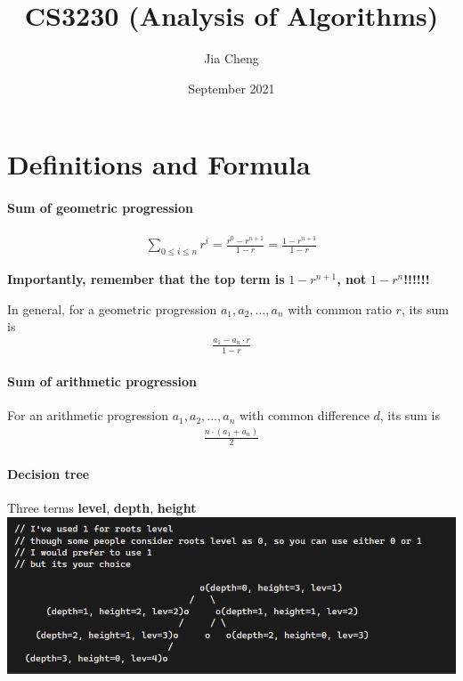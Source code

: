 \documentclass{article}
\title{CS3230 (Analysis of Algorithms)}
\author{Jia Cheng}
\date{September 2021}
\begin{document}
\maketitle

\section{Definitions and Formula}
\paragraph{Sum of geometric progression}
\begin{align*}
	\sum_{0\leq i\leq n}r^i = \frac{r^0-r^{n+1}}{1-r}=\frac{1-r^{n+1}}{1-r}
\end{align*}

\textbf{Importantly, remember that the top term is} $1-r^{n+1}$\textbf{, not} $1-r^n$\textbf{!!!!!!}

In general, for a geometric progression $a_1, a_2, \dots, a_n$ with common ratio $r$, its sum is \begin{align*}
	\frac{a_1 - a_n\cdot r}{1-r}
\end{align*}

\paragraph{Sum of arithmetic progression}
For an arithmetic progression $a_1, a_2, \dots, a_n$ with common difference $d$, its sum is
\begin{align*}
	\frac{n\cdot (a_1+a_n)}{2}
\end{align*}

\paragraph{Decision tree} Three terms \textbf{level}, \textbf{depth}, \textbf{height}\\
\includegraphics[scale=0.8]{tree.png}
\end{document}
